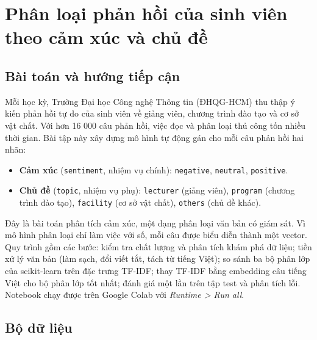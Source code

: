 \chapter[Phân loại phản hồi của sinh viên]{Phân loại phản hồi của sinh viên theo cảm xúc và chủ đề}

\section{Bài toán và hướng tiếp cận}

Mỗi học kỳ, Trường Đại học Công nghệ Thông tin (ĐHQG-HCM) thu thập ý kiến phản hồi tự do của sinh viên về giảng viên,
chương trình đào tạo và cơ sở vật chất. Với hơn 16 000 câu phản hồi, việc đọc và phân loại thủ công tốn nhiều thời
gian. Bài tập này xây dựng mô hình tự động gán cho mỗi câu phản hồi hai nhãn:

\begin{itemize}
  \item \textbf{Cảm xúc} (\texttt{sentiment}, nhiệm vụ chính): \texttt{negative}, \texttt{neutral}, \texttt{positive}.
  \item \textbf{Chủ đề} (\texttt{topic}, nhiệm vụ phụ): \texttt{lecturer} (giảng viên), \texttt{program} (chương trình
        đào tạo), \texttt{facility} (cơ sở vật chất), \texttt{others} (chủ đề khác).
\end{itemize}

Đây là bài toán phân tích cảm xúc, một dạng phân loại văn bản có giám sát. Vì mô hình phân loại chỉ làm việc với số,
mỗi câu được biểu diễn thành một vector. Quy trình gồm các bước: kiểm tra chất lượng và phân tích khám phá dữ liệu; tiền
xử lý văn bản (làm sạch, đổi viết tắt, tách từ tiếng Việt); so sánh ba bộ phân lớp của scikit-learn trên đặc trưng
TF-IDF; thay TF-IDF bằng embedding câu tiếng Việt cho bộ phân lớp tốt nhất; đánh giá một lần trên tập test và phân tích
lỗi. Notebook chạy được trên Google Colab với \textit{Runtime > Run all}.

\section{Bộ dữ liệu}

